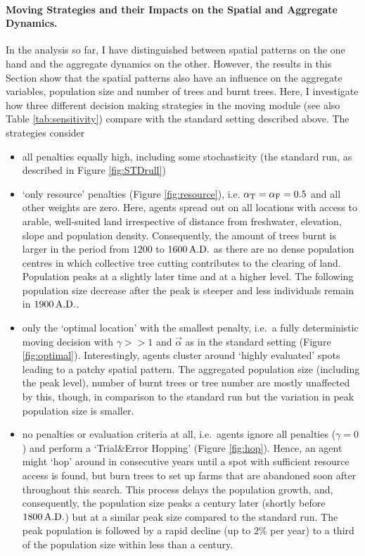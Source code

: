 \paragraph{Moving Strategies and their Impacts on the Spatial and Aggregate Dynamics.}
In the analysis so far, I have distinguished between spatial patterns on the one hand and the aggregate dynamics on the other.
However, the results in this Section show that the spatial patterns also have an influence on the aggregate variables, population size and number of trees and burnt trees.
Here, I investigate how three different decision making strategies in the moving module (see also Table \ref{tab:sensitivity}) compare with the standard setting described above. The strategies consider
\begin{itemize}
	\item  all penalties equally high, including some stochasticity (the standard run, as described in Figure \ref{fig:STDrull}) 
	\item `only resource' penalties (Figure \ref{fig:resource}), i.e. $\alpha_{\rm T}= \alpha_{\rm F} = 0.5$ and all other weights are zero.
	Here, agents spread out on all locations with access to arable, well-suited land irrespective of distance from freshwater, elevation, slope and population density.
	Consequently, the amount of trees burnt is larger in the period from $1200$ to $1600\, {\rm A.D.}$ as there are no dense population centres in which collective tree cutting contributes to the clearing of land. 
	Population peaks at a slightly later time and at a higher level. 
	The following population size decrease after the peak is steeper and less individuals remain in $1900\, {\rm A.D.}$.
	\item only the `optimal location' with the smallest penalty, i.e.\ a fully deterministic moving decision with $\gamma>>1$ and $\vec{\alpha}$ as in the standard setting (Figure \ref{fig:optimal}).
	Interestingly, agents cluster around `highly evaluated' spots leading to a patchy spatial pattern. The aggregated population size (including the peak level), number of burnt trees or tree number are mostly unaffected by this, though, in comparison to the standard run but the variation in peak population size is smaller.
	\item no penalties or evaluation criteria at all, i.e.\ agents ignore all penalties ($\gamma = 0$) and perform a `Trial\&Error Hopping' (Figure \ref{fig:hop}).
	Hence, an agent might `hop' around in consecutive years until a spot with sufficient resource access is found, but burn trees to set up farms that are abandoned soon after throughout this search.
	This process delays the population growth, and, consequently, the population size peaks a century later (shortly before $1800\, {\rm A.D.}$) but at a similar peak size compared to the standard run. The peak population is followed by a rapid decline (up to $2\%$ per year) to a third of the population size within less than a century.
\end{itemize}
